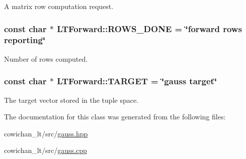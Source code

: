 A matrix row computation request. \hypertarget{class_l_t_forward_52da5e0079361dc8daf8c6a9a976c98d}{
\subsubsection[{ROWS\_\-DONE}]{\setlength{\rightskip}{0pt plus 5cm}const char $\ast$ {\bf LTForward::ROWS\_\-DONE} = \char`\"{}forward rows reporting\char`\"{}}}
\label{class_l_t_forward_52da5e0079361dc8daf8c6a9a976c98d}


Number of rows computed. \hypertarget{class_l_t_forward_79ab5e95abdc47acc8150941a17fb54a}{
\subsubsection[{TARGET}]{\setlength{\rightskip}{0pt plus 5cm}const char $\ast$ {\bf LTForward::TARGET} = \char`\"{}gauss target\char`\"{}}}
\label{class_l_t_forward_79ab5e95abdc47acc8150941a17fb54a}


The target vector stored in the tuple space. 

The documentation for this class was generated from the following files:\begin{CompactItemize}
\item 
cowichan\_\-lt/src/\hyperlink{gauss_8hpp}{gauss.hpp}\item 
cowichan\_\-lt/src/\hyperlink{cowichan__lt_2src_2gauss_8cpp}{gauss.cpp}\end{CompactItemize}
